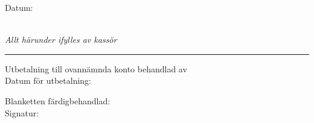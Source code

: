 \documentclass[12pt]{article}
\begin{document}
\begin{minipage}[H]{40mm}
    Datum: \hrulefill
\end{minipage}
\vspace*{5mm}\\
\textit{Allt härunder ifylles av kassör}\\[-8pt]
\rule{\textwidth}{2pt}\vspace*{5mm}
\begin{minipage}[H]{0.4\textwidth}
    \doublespacing
Utbetalning till ovannämnda konto behandlad av \hrulefill\\
Datum för utbetalning: \hrulefill
\end{minipage}
\hfill
\begin{minipage}[H]{0.5\textwidth}
    \doublespacing
    Blanketten färdigbehandlad: \hrulefill\\
    Signatur: \hrulefill\\
\end{minipage}
\end{document}
